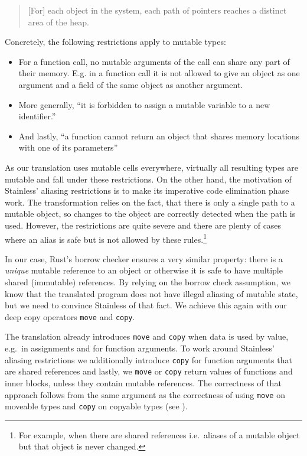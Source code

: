 \begin{quote}
{[}For{]} each object in the system, each path of pointers reaches a
distinct area of the heap. \cite[p.~59]{regb}
\end{quote}

Concretely, the following restrictions apply to mutable types:

\begin{itemize}
\tightlist
\item
  For a function call, no mutable arguments of the call can share any
  part of their memory. E.g. in a function call it is not allowed to
  give an object as one argument and a field of the same object as
  another argument.
\item
  More generally, ``it is forbidden to assign a mutable variable to a
  new identifier.'' \cite[p.~59]{regb}
\item
  And lastly, ``a function cannot return an object that shares memory
  locations with one of its parameters'' \cite[p.~59]{regb}
\end{itemize}

As our translation uses mutable cells everywhere, virtually all
resulting types are mutable and fall under these restrictions. On the
other hand, the motivation of Stainless' aliasing restrictions is to
make its imperative code elimination phase work. \cite{regb} The
transformation relies on the fact, that there is only a single path to a
mutable object, so changes to the object are correctly detected when the
path is used. However, the restrictions are quite severe and there are
plenty of cases where an alias is safe but is not allowed by these
rules.\footnote{For example, when there are shared references i.e.~aliases of a
mutable object but that object is never changed.}

In our case, Rust's borrow checker ensures a very similar property:
there is a \emph{unique} mutable reference to an object or otherwise it
is safe to have multiple shared (immutable) references. By relying on
the borrow check assumption, we know that the translated program does
not have illegal aliasing of mutable state, but we need to convince
Stainless of that fact. We achieve this again with our deep copy
operators \passthrough{\lstinline!move!} and
\passthrough{\lstinline!copy!}.

The translation already introduces \passthrough{\lstinline!move!} and
\passthrough{\lstinline!copy!} when data is used by value, e.g.~in
assignments and for function arguments. To work around Stainless'
aliasing restrictions we additionally introduce
\passthrough{\lstinline!copy!} for function arguments that are shared
references and lastly, we \passthrough{\lstinline!move!} or
\passthrough{\lstinline!copy!} return values of functions and inner
blocks, unless they contain mutable references. The correctness of that
approach follows from the same argument as the correctness of using
\passthrough{\lstinline!move!} on moveable types and
\passthrough{\lstinline!copy!} on copyable types (see ).

